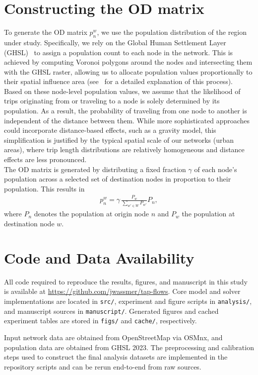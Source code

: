 \documentclass[twocolumn,english,groupedaddress, superscriptaddress,aps,pre,10pt,floatfix]{revtex4-2}
\providecommand{\DIFaddbegin}{} %
\providecommand{\DIFaddend}{} %
\providecommand{\DIFdelbegin}{} %
\providecommand{\DIFdelend}{} %
\newcommand{\DIFscaledelfig}{0.5}
\newlength{\DIFdelgraphicswidth} %
\newlength{\DIFdelgraphicsheight} %
\newcommand{\DIFaddincludegraphics}[2][]{{\color{blue}\fbox{\DIFOincludegraphics[#1]{#2}}}} %
\newcommand{\DIFdelincludegraphics}[2][]{%
\sbox{\DIFdelgraphicsbox}{\DIFOincludegraphics[#1]{#2}}%
\settoboxwidth{\DIFdelgraphicswidth}{\DIFdelgraphicsbox} %
\settoboxtotalheight{\DIFdelgraphicsheight}{\DIFdelgraphicsbox} %
\scalebox{\DIFscaledelfig}{%
\parbox[b]{\DIFdelgraphicswidth}{\usebox{\DIFdelgraphicsbox}\\[-\baselineskip] \rule{\DIFdelgraphicswidth}{0em}}\llap{\resizebox{\DIFdelgraphicswidth}{\DIFdelgraphicsheight}{%
\setlength{\unitlength}{\DIFdelgraphicswidth}%
\begin{picture}(1,1)%
\thicklines\linethickness{2pt} %
{\color[rgb]{1,0,0}\put(0,0){\framebox(1,1){}}}%
{\color[rgb]{1,0,0}\put(0,0){\line( 1,1){1}}}%
{\color[rgb]{1,0,0}\put(0,1){\line(1,-1){1}}}%
\end{picture}%
}\hspace*{3pt}}} %
} %
\DeclareRobustCommand{\DIFaddbegin}{\DIFOaddbegin \let\includegraphics\DIFaddincludegraphics} %
\DeclareRobustCommand{\DIFaddend}{\DIFOaddend \let\includegraphics\DIFOincludegraphics} %
\DeclareRobustCommand{\DIFdelbegin}{\DIFOdelbegin \let\includegraphics\DIFdelincludegraphics} %
\DeclareRobustCommand{\DIFdelend}{\DIFOaddend \let\includegraphics\DIFOincludegraphics} %
\begin{document}
\section{Constructing the OD matrix}\label{sec:od-matrix}
To generate the OD matrix $p_n^w$, we use the population distribution of the region under study. Specifically, we rely on the Global Human Settlement Layer (GHSL)~\cite{GHSL2023} to assign a population count to each node in the network. This is achieved by computing Voronoi polygons around the nodes and intersecting them with the GHSL raster, allowing us to allocate population values proportionally to their spatial influence area (see~\citep{wassmer2024resilience, wassmer2025unveiling} for a detailed explanation of this process).\\

Based on these node-level population values, we assume that the likelihood of trips originating from or traveling to a node is solely determined by its population. As a result, the probability of traveling from one node to another is independent of the distance between them. While more sophisticated approaches could incorporate distance-based effects, such as a gravity model, this simplification is justified by the typical spatial scale of our networks (urban areas), where trip length distributions are relatively homogeneous and distance effects are less pronounced.\\

The OD matrix is generated by distributing a fixed fraction $\gamma$ of each node’s population across a selected set of destination nodes in proportion to their population. This results in
\begin{align*}
    p_n^w = \gamma \, \frac{P_w}{\sum_{w' \in W} P_{w'}} P_n,
\end{align*}
where $P_n$ denotes the population at origin node $n$ and $P_w$ the population at destination node $w$. 


\section*{Code and Data Availability}
All code required to reproduce the results, figures, and manuscript in this study is available at \url{https://github.com/jwassmer/tap-flows}. Core model and solver implementations are located in \texttt{src/}, experiment and figure scripts in \texttt{analysis/}, and manuscript sources in \texttt{manuscript/}. Generated figures and cached experiment tables are stored in \texttt{figs/} and \texttt{cache/}, respectively.

Input network data are obtained from OpenStreetMap via OSMnx, and population data are obtained from GHSL 2023\cite{GHSL2023}. The preprocessing and calibration steps used to construct the final analysis datasets are implemented in the repository scripts and can be rerun end-to-end from raw sources.







\DIFdelbegin %
\DIFdelend \DIFaddbegin 
 \DIFaddend
\end{document}
